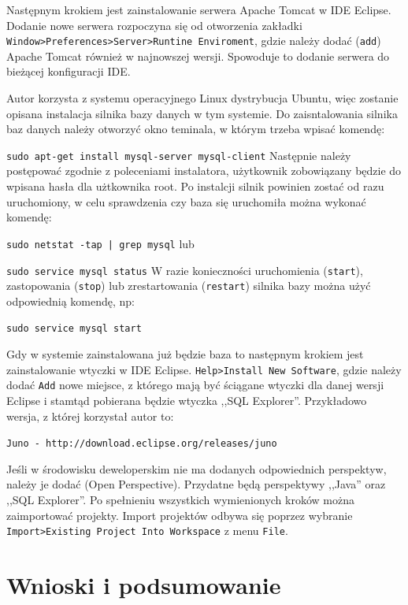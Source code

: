 \documentclass[eng,printmode,oneside]{mgr}
\begin{document}
Następnym krokiem jest zainstalowanie serwera Apache Tomcat w IDE Eclipse.
Dodanie nowe serwera rozpoczyna się od otworzenia zakładki
\texttt{Window>Preferences>Server>Runtine Enviroment}, gdzie należy dodać
(\texttt{add}) Apache Tomcat również w najnowszej wersji. Spowoduje to
dodanie serwera do bieżącej konfiguracji IDE.

Autor korzysta z systemu operacyjnego Linux dystrybucja Ubuntu, więc zostanie
opisana instalacja silnika bazy danych w tym systemie. Do zaisntalowania silnika
baz danych należy otworzyć okno teminala, w którym trzeba wpisać komendę:

\texttt{sudo apt-get install mysql-server mysql-client} 
\newline Następnie należy postępować zgodnie z poleceniami instalatora,
użytkownik zobowiązany będzie do wpisana hasła dla użtkownika root. Po instalcji
silnik powinien zostać od razu uruchomiony, w celu sprawdzenia czy baza się
uruchomiła można wykonać komendę:

\texttt{sudo netstat -tap | grep mysql}
\newline lub

\texttt{sudo service mysql status}
\newline W razie konieczności uruchomienia (\texttt{start}), zastopowania
(\texttt{stop}) lub zrestartowania (\texttt{restart}) silnika bazy można użyć
odpowiednią komendę, np:

\texttt{sudo service mysql start}

Gdy w systemie zainstalowana już będzie baza to następnym krokiem jest
zainstalowanie wtyczki w IDE Eclipse. \texttt{Help>Install New Software}, gdzie
należy dodać \texttt{Add} nowe miejsce, z którego mają być ściągane wtyczki dla
danej wersji Eclipse i stamtąd pobierana będzie wtyczka ,,SQL Explorer''.
Przykładowo wersja, z której korzystał autor to:

\texttt{Juno - http://download.eclipse.org/releases/juno}

Jeśli w środowisku deweloperskim nie ma dodanych odpowiednich perspektyw,
należy je dodać (Open Perspective). Przydatne będą perspektywy
,,Java'' oraz ,,SQL Explorer''.
Po spełnieniu wszystkich wymienionych kroków można zaimportować
projekty. Import projektów odbywa się poprzez wybranie
\texttt{Import>Existing Project Into Workspace} z menu \texttt{File}.

\chapter{Wnioski i podsumowanie}
\end{document}
